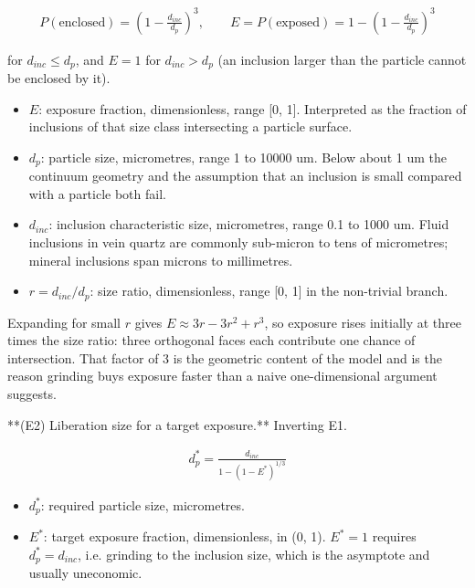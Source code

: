 \documentclass[10pt,a4paper,twoside]{report}
\begin{document}
\begin{equation*}
\begin{gathered}
P(\text{enclosed}) = \left( 1 - \frac{d_{inc}}{d_p} \right)^{3}, \qquad E = P(\text{exposed}) = 1 - \left( 1 - \frac{d_{inc}}{d_p} \right)^{3}
\end{gathered}
\end{equation*}

for $d_{inc} \le d_p$, and $E = 1$ for $d_{inc} > d_p$ (an inclusion larger than the particle cannot be enclosed by it).

\begin{itemize}
\item $E$: exposure fraction, dimensionless, range [0, 1]. Interpreted as the fraction of inclusions of that size class intersecting a particle surface.
\item $d_p$: particle size, micrometres, range 1 to 10000 um. Below about 1 um the continuum geometry and the assumption that an inclusion is small compared with a particle both fail.
\item $d_{inc}$: inclusion characteristic size, micrometres, range 0.1 to 1000 um. Fluid inclusions in vein quartz are commonly sub-micron to tens of micrometres; mineral inclusions span microns to millimetres.
\item $r = d_{inc}/d_p$: size ratio, dimensionless, range [0, 1] in the non-trivial branch.
\end{itemize}

Expanding for small $r$ gives $E \approx 3r - 3r^2 + r^3$, so exposure rises initially at three times the size ratio: three orthogonal faces each contribute one chance of intersection. That factor of 3 is the geometric content of the model and is the reason grinding buys exposure faster than a naive one-dimensional argument suggests.

**(E2) Liberation size for a target exposure.** Inverting E1.

\begin{equation*}
\begin{gathered}
d_p^{*} = \frac{d_{inc}}{1 - (1 - E^{*})^{1/3}}
\end{gathered}
\end{equation*}

\begin{itemize}
\item $d_p^{*}$: required particle size, micrometres.
\item $E^{*}$: target exposure fraction, dimensionless, in (0, 1). $E^{*} = 1$ requires $d_p^{*} = d_{inc}$, i.e. grinding to the inclusion size, which is the asymptote and usually uneconomic.
\end{itemize}
\end{document}
